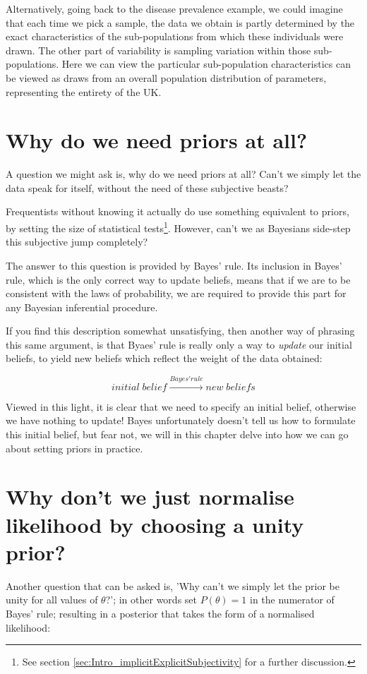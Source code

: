 \documentclass[11pt,fullpage]{book}
\begin{document}
Alternatively, going back to the disease prevalence example, we could imagine that each time we pick a sample, the data we obtain is partly determined by the exact characteristics of the sub-populations from which these individuals were drawn. The other part of variability is sampling variation within those sub-populations. Here we can view the particular sub-population characteristics can be viewed as draws from an overall population distribution of parameters, representing the entirety of the UK. 

\section{Why do we need priors at all?}
A question we might ask is, why do we need priors at all? Can't we simply let the data speak for itself, without the need of these subjective beasts? 

Frequentists without knowing it actually do use something equivalent to priors, by setting the size of statistical tests\footnote{See section \ref{sec:Intro_implicitExplicitSubjectivity} for a further discussion.}. However, can't we as Bayesians side-step this subjective jump completely?

The answer to this question is provided by Bayes' rule. Its inclusion in Bayes' rule, which is the only correct way to update beliefs, means that if we are to be consistent with the laws of probability, we are required to provide this part for any Bayesian inferential procedure. 

If you find this description somewhat unsatisfying, then another way of phrasing this same argument, is that Byaes' rule is really only a way to \textit{update} our initial beliefs, to yield new beliefs which reflect the weight of the data obtained:

\begin{equation}
initial\; belief \xrightarrow{Bayes' rule} new\;beliefs
\end{equation}

Viewed in this light, it is clear that we need to specify an initial belief, otherwise we have nothing to update! Bayes unfortunately doesn't tell us how to formulate this initial belief, but fear not, we will in this chapter delve into how we can go about setting priors in practice.

\section{Why don't we just normalise likelihood by choosing a unity prior?}\label{sec:Prior_unityPrior}
Another question that can be asked is, 'Why can't we simply let the prior be unity for all values of $\theta$?'; in other words set $P(\theta) = 1$ in the numerator of Bayes' rule; resulting in a posterior that takes the form of a normalised likelihood:
\end{document}
